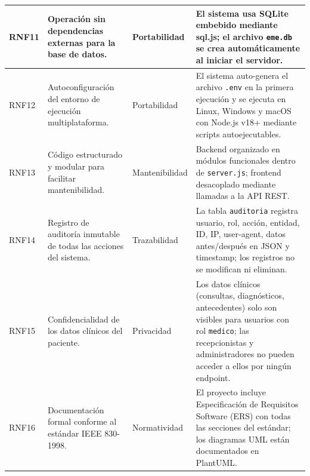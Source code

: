 \documentclass[11pt,a4paper]{article}
\begin{document}
\begin{longtable}{|C{1.2cm}|L{5cm}|L{2.5cm}|L{5cm}|}
    RNF11       & Operación sin dependencias externas para la base de datos.                                               & Portabilidad       & El sistema usa SQLite embebido mediante sql.js; el archivo \texttt{eme.db} se crea automáticamente al iniciar el servidor.                                                                              \\
    \hline

    RNF12       & Autoconfiguración del entorno de ejecución multiplataforma.                                              & Portabilidad       & El sistema auto-genera el archivo \texttt{.env} en la primera ejecución y se ejecuta en Linux, Windows y macOS con Node.js v18+ mediante scripts autoejecutables.                                       \\
    \hline

    RNF13       & Código estructurado y modular para facilitar mantenibilidad.                                             & Mantenibilidad     & Backend organizado en módulos funcionales dentro de \texttt{server.js}; frontend desacoplado mediante llamadas a la API REST.                                                                           \\
    \hline

    RNF14       & Registro de auditoría inmutable de todas las acciones del sistema.                                       & Trazabilidad       & La tabla \texttt{auditoria} registra usuario, rol, acción, entidad, ID, IP, user-agent, datos antes/después en JSON y timestamp; los registros no se modifican ni eliminan.                             \\
    \hline

    RNF15       & Confidencialidad de los datos clínicos del paciente.                                                     & Privacidad         & Los datos clínicos (consultas, diagnósticos, antecedentes) solo son visibles para usuarios con rol \texttt{medico}; las recepcionistas y administradores no pueden acceder a ellos por ningún endpoint. \\
    \hline

    RNF16       & Documentación formal conforme al estándar IEEE 830-1998.                                                 & Normatividad       & El proyecto incluye Especificación de Requisitos Software (ERS) con todas las secciones del estándar; los diagramas UML están documentados en PlantUML.                                                 \\
    \hline


\end{longtable}
\end{document}
